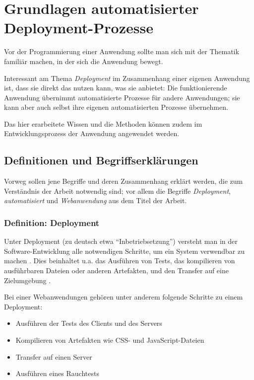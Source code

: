 \chapter{Grundlagen automatisierter Deployment-Prozesse}

Vor der Programmierung einer Anwendung sollte man sich mit der Thematik familiär machen, in der sich die Anwendung bewegt.

Interessant am Thema \emph{Deployment} im Zusammenhang einer eigenen Anwendung ist, dass sie direkt das nutzen kann, was sie anbietet: Die funktionierende Anwendung übernimmt automatisierte Prozesse für andere Anwendungen; sie kann aber auch selbst ihre eigenen automatisierten Prozesse übernehmen.

Das hier erarbeitete Wissen und die Methoden können zudem im Entwicklungsprozess der Anwendung angewendet werden.

\section{Definitionen und Begriffserklärungen}

Vorweg sollen jene Begriffe und deren Zusammenhang erklärt werden, die zum Verständnis der Arbeit notwendig sind; vor allem die Begriffe \emph{Deployment}, \emph{automatisiert} und \emph{Webanwendung} aus dem Titel der Arbeit.

\subsection{Definition: Deployment}

Unter Deployment (zu deutsch etwa ``Inbetriebsetzung'') versteht man in der Soft\-ware-Entwicklung alle notwendigen Schritte, um ein System verwendbar zu machen \citep[21]{Breuer2009}. Dies beinhaltet u.a. das Ausführen von Tests, das kompilieren von ausführbaren Dateien oder anderen Artefakten, und den Transfer auf eine Zielumgebung \citep[4]{Humble2010}.

Bei einer Webanwendungen gehören unter anderem folgende Schritte zu einem Deployment:

\begin{itemize}
  \item Ausführen der Tests des Clients und des Servers
  \item Kompilieren von Artefakten wie CSS- und JavaScript-Dateien
  \item Transfer auf einen Server
  \item Ausführen eines Rauchtests
\end{itemize}

